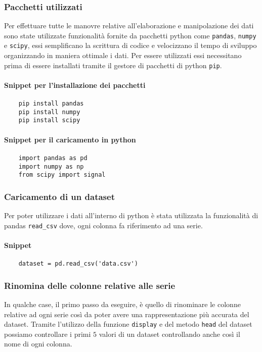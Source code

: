 \subsubsection{Pacchetti utilizzati}
Per effettuare tutte le manovre relative all'elaborazione e manipolazione dei dati sono state
utilizzate funzionalità fornite da pacchetti python come \texttt{pandas}, \texttt{numpy} e \texttt{scipy}, essi semplificano
la scrittura di codice e velocizzano il tempo di sviluppo organizzando in maniera ottimale
i dati. Per essere utilizzati essi necessitano prima di essere installati tramite il
gestore di pacchetti di python \texttt{pip}.
\paragraph{Snippet per l'installazione dei pacchetti}
\begin{verbatim}
    pip install pandas
    pip install numpy
    pip install scipy
\end{verbatim}
\paragraph{Snippet per il caricamento in python}
\begin{verbatim}
    import pandas as pd
    import numpy as np
    from scipy import signal
\end{verbatim}



\subsubsection{Caricamento di un dataset}
Per poter utilizzare i dati all'interno di python è stata utilizzata
la funzionalità di pandas \texttt{read\_csv} dove, ogni colonna fa riferimento 
ad una serie.
\paragraph{Snippet}
\begin{verbatim}
    dataset = pd.read_csv('data.csv')
\end{verbatim}





\subsubsection{Rinomina delle colonne relative alle serie}
In qualche case, il primo passo da eseguire, è quello di rinominare
le colonne relative ad ogni serie così da poter avere una rappresentazione
più accurata del dataset.
Tramite l'utilizzo della funzione \texttt{display} e del metodo \texttt{head}
del dataset possiamo controllare i primi $5$ valori di un dataset
controllando anche così il nome di ogni colonna.
